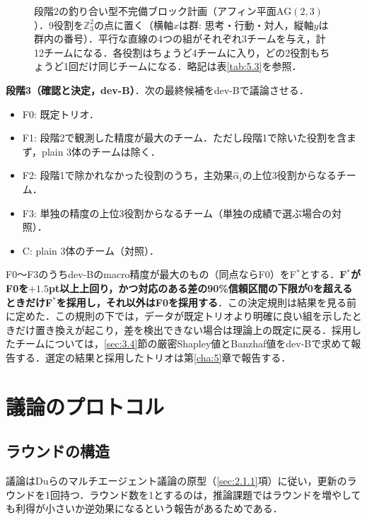 \begin{figure}[htbp]
\centering

\caption{段階2の釣り合い型不完備ブロック計画（アフィン平面$\mathrm{AG}(2,3)$）．9役割を$\mathbb{Z}_3^2$の点に置く（横軸$x$は群: 思考・行動・対人，縦軸$y$は群内の番号）．平行な直線の4つの組がそれぞれ3チームを与え，計12チームになる．各役割はちょうど4チームに入り，どの2役割もちょうど1回だけ同じチームになる．略記は表\ref{tab:5.3}を参照．}
\label{fig:3.3}
\end{figure}

\textbf{段階3（確認と決定，dev-B）}．次の最終候補をdev-Bで議論させる．
\begin{itemize}
\item F0: 既定トリオ．
\item F1: 段階2で観測した精度が最大のチーム．ただし段階1で除いた役割を含まず，plain 3体のチームは除く．
\item F2: 段階1で除かれなかった役割のうち，主効果$\hat{\alpha}_i$の上位3役割からなるチーム．
\item F3: 単独の精度の上位3役割からなるチーム（単独の成績で選ぶ場合の対照）．
\item C: plain 3体のチーム（対照）．
\end{itemize}
F0〜F3のうちdev-Bのmacro精度が最大のもの（同点ならF0）をF$^*$とする．\textbf{F$^*$がF0を$+1.5$pt以上上回り，かつ対応のある差の90\%信頼区間の下限が0を超えるときだけF$^*$を採用し，それ以外はF0を採用する}．この決定規則は結果を見る前に定めた．この規則の下では，データが既定トリオより明確に良い組を示したときだけ置き換えが起こり，差を検出できない場合は理論上の既定に戻る．採用したチームについては，\ref{sec:3.4}節の厳密Shapley値とBanzhaf値をdev-Bで求めて報告する．選定の結果と採用したトリオは第\ref{cha:5}章で報告する．

\section{議論のプロトコル}
\label{sec:3.3}

\subsection{ラウンドの構造}
\label{sec:3.3.1}

議論はDuらのマルチエージェント議論\cite{du2023improving}の原型（\ref{sec:2.1.1}項）に従い，更新のラウンドを1回持つ．ラウンド数を1とするのは，推論課題ではラウンドを増やしても利得が小さいか逆効果になるという報告があるためである\cite{choi2025debate,kaesberg2025voting}．

